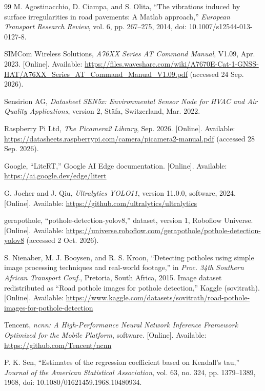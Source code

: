 \begin{thebibliography}{99}
 M. Agostinacchio, D. Ciampa, and S. Olita, ``The vibrations induced by surface irregularities in road pavements: A Matlab approach,'' \emph{European Transport Research Review}, vol. 6, pp. 267--275, 2014, doi: 10.1007/s12544-013-0127-8.

 SIMCom Wireless Solutions, \emph{A76XX Series AT Command Manual}, V1.09, Apr. 2023. [Online]. Available: \url{https://files.waveshare.com/wiki/A7670E-Cat-1-GNSS-HAT/A76XX_Series_AT_Command_Manual_V1.09.pdf} (accessed 24 Sep. 2026).

 Sensirion AG, \emph{Datasheet SEN5x: Environmental Sensor Node for HVAC and Air Quality Applications}, version 2, Stäfa, Switzerland, Mar. 2022.

 Raspberry Pi Ltd, \emph{The Picamera2 Library}, Sep. 2026. [Online]. Available: \url{https://datasheets.raspberrypi.com/camera/picamera2-manual.pdf} (accessed 28 Sep. 2026).

 Google, ``LiteRT,'' Google AI Edge documentation. [Online]. Available: \url{https://ai.google.dev/edge/litert}

 G. Jocher and J. Qiu, \emph{Ultralytics YOLO11}, version 11.0.0, software, 2024. [Online]. Available: \url{https://github.com/ultralytics/ultralytics}

 gerapothole, ``pothole-detection-yolov8,'' dataset, version 1, Roboflow Universe. [Online]. Available: \url{https://universe.roboflow.com/gerapothole/pothole-detection-yolov8} (accessed 2 Oct. 2026).

 S. Nienaber, M. J. Booysen, and R. S. Kroon, ``Detecting potholes using simple image processing techniques and real-world footage,'' in \emph{Proc. 34th Southern African Transport Conf.}, Pretoria, South Africa, 2015. Image dataset redistributed as ``Road pothole images for pothole detection,'' Kaggle (sovitrath). [Online]. Available: \url{https://www.kaggle.com/datasets/sovitrath/road-pothole-images-for-pothole-detection}

 Tencent, \emph{ncnn: A High-Performance Neural Network Inference Framework Optimized for the Mobile Platform}, software. [Online]. Available: \url{https://github.com/Tencent/ncnn}

 P. K. Sen, ``Estimates of the regression coefficient based on Kendall's tau,'' \emph{Journal of the American Statistical Association}, vol. 63, no. 324, pp. 1379--1389, 1968, doi: 10.1080/01621459.1968.10480934.


\end{thebibliography}

